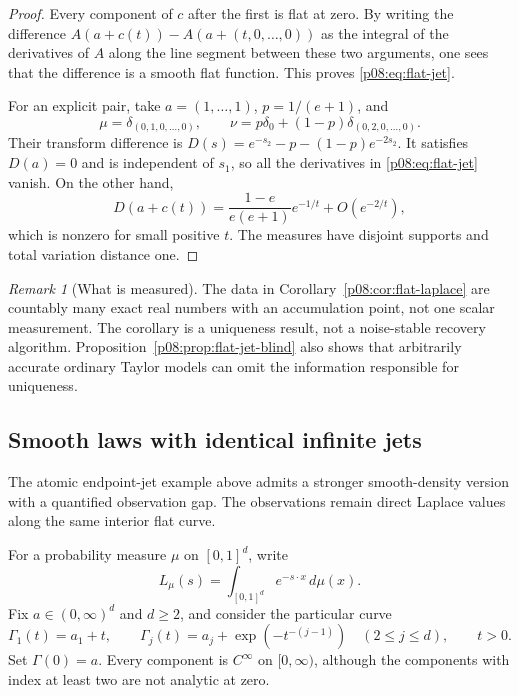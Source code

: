 \documentclass[11pt,letterpaper]{article}
\theoremstyle{definition}
\theoremstyle{remark}
\newtheorem{remark}[theorem]{Remark}
\newcommand{\1}{\mathbf 1}
\begin{document}
\begin{proof}
Every component of $c$ after the first is flat at zero.
By writing the difference
$A(a+c(t))-A(a+(t,0,\ldots,0))$ as the integral of the derivatives
of $A$ along the line segment between these two arguments,
one sees that the difference is a smooth flat function.  This proves
\eqref{p08:eq:flat-jet}.

For an explicit pair, take $a=(1,\ldots,1)$,
$p=1/(e+1)$, and
\[
 \mu=\delta_{(0,1,0,\ldots,0)},\qquad
 \nu=p\delta_0+(1-p)\delta_{(0,2,0,\ldots,0)}.
\]
Their transform difference is
$D(s)=e^{-s_2}-p-(1-p)e^{-2s_2}$.
It satisfies $D(a)=0$ and is independent of $s_1$, so all the
derivatives in \eqref{p08:eq:flat-jet} vanish.  On the other hand,
\[
 D(a+c(t))
 =\frac{1-e}{e(e+1)}e^{-1/t}+O(e^{-2/t}),
\]
which is nonzero for small positive $t$.
The measures have disjoint supports and total variation distance one.
\end{proof}

\begin{remark}[What is measured]
The data in Corollary~\ref{p08:cor:flat-laplace} are countably many exact
real numbers with an accumulation point, not one scalar measurement.
The corollary is a uniqueness result, not a noise-stable recovery
algorithm.  Proposition~\ref{p08:prop:flat-jet-blind} also shows that
arbitrarily accurate ordinary Taylor models can omit the information
responsible for uniqueness.
\end{remark}

\subsection{Smooth laws with identical infinite jets}
\label{p08:sec:flat-smooth-barriers}

The atomic endpoint-jet example above admits a stronger smooth-density
version with a quantified observation gap. The observations remain direct
Laplace values along the same interior flat curve.

For a probability measure $\mu$ on $[0,1]^d$, write
\[
 L_\mu(s)=\int_{[0,1]^d}e^{-s\cdot x}\,d\mu(x).
\]
Fix $a\in(0,\infty)^d$ and $d\geq2$, and consider the particular curve
\begin{equation}\label{p08:eq:barrier-flat-curve}
 \Gamma_1(t)=a_1+t,\qquad
 \Gamma_j(t)=a_j+\exp(-t^{-(j-1)})\quad(2\leq j\leq d),\qquad t>0.
\end{equation}
Set $\Gamma(0)=a$.  Every component is $C^\infty$ on $[0,\infty)$,
although the components with index at least two are not analytic at zero.
\end{document}
